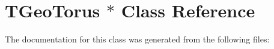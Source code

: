 \hypertarget{class_t_geo_torus_01_5}{
\section{TGeoTorus $\ast$ Class Reference}
\label{class_t_geo_torus_01_5}
}


The documentation for this class was generated from the following files: